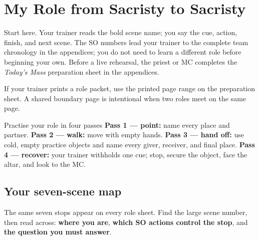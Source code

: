 \section{My Role from Sacristy to Sacristy}

Start here. Your trainer reads the bold scene name; you say the cue, action,
finish, and next scene. The SO numbers lead your trainer to the complete team
chronology in the appendices; you do not need to learn a different role before
beginning your own. Before a live rehearsal, the priest or MC completes the
\emph{Today's Mass} preparation sheet in the appendices.

If your trainer prints a role packet, use the printed page range on the
preparation sheet. A shared boundary page is intentional when two roles meet
on the same page.

\Needspace{0.16\textheight}
\begin{learnerbox}{Practise your role in four passes}
\textbf{Pass 1 --- point:} name every place and partner. \quad
\textbf{Pass 2 --- walk:} move with empty hands. \quad
\textbf{Pass 3 --- hand off:} use cold, empty practice objects and name every
giver, receiver, and final place. \quad
\textbf{Pass 4 --- recover:} your trainer withholds one cue; stop, secure the
object, face the altar, and look to the MC.
\end{learnerbox}

\subsection*{Your seven-scene map}

\noindent
The same seven stops appear on every role sheet. Find the large scene number,
then read across: \textbf{where you are}, \textbf{which SO actions control the
stop}, and \textbf{the question you must answer}.

\newcommand{\SolemnMapStop}[4]{%
  \noindent
  \begin{minipage}[c]{0.105\linewidth}
    \centering
    \colorbox{black}{%
      \parbox[c][3.3em][c]{2.8em}{%
        \centering\color{white}\fontsize{22}{22}\selectfont\bfseries #1}}
  \end{minipage}\hfill
  \begin{minipage}[c]{0.865\linewidth}
    {\large\bfseries #2}\hfill
    {\small\bfseries #3}\par
    \smallskip
    {\normalsize #4}
  \end{minipage}\par
  \vspace{0.28em}\hrule height 0.45pt\vspace{0.28em}}

